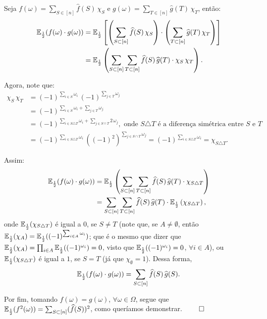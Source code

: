 \par Seja $f(\omega) = \sum_{S \in [n]}\widehat{f}(S)\,\chi_S$ e $g(\omega) = \sum_{T \in [n]}\widehat{g}(T)\,\chi_T$, então:
\begin{align*}
	\operatorname{\mathbb{E}}_{\frac{1}{2}}(f(\omega) \cdot g(\omega)) & = \operatorname{\mathbb{E}}_{\frac{1}{2}}\left[\left(\sum_{S \subset [n]} \widehat{f}(S) \, \chi_S\right) \cdot \left(\sum_{T \subset [n]} \widehat{g}(T) \, \chi_T\right)\right] \\
					  				 & = \operatorname{\mathbb{E}}_{\frac{1}{2}}\left(\sum_{S \subset [n]}\sum_{T \subset[n]} \widehat{f}(S) \, \widehat{g}(T) \cdot \chi_S \, \chi_T\right).
\end{align*}
\par Agora, note que:
\begin{align*}
	\chi_S \, \chi_T & = (-1)^{\sum_{i \in S}\omega_i} \, (-1)^{\sum_{j \in T}\omega_j} \\
					 & = (-1)^{\sum_{i \in S}\omega_i + \sum_{j \in T}\omega_j} \\
					 & = (-1)^{\sum_{i \in S \triangle T}\omega_i + \sum_{j \in S \cap T}2\,\omega_j}, \text{ onde } S \triangle T \text{ é a diferença simétrica entre } S \text{ e } T \\
					 & = (-1)^{\sum_{i \in S \triangle T}\omega_i} \, \left((-1)^2\right)^{\sum_{j \in S \cap T} \omega_j} = (-1)^{\sum_{i \in S \triangle T}\omega_i} = \chi_{S \triangle T}.
\end{align*} 
\par Assim:
\begin{align*}
	\operatorname{\mathbb{E}}_{\frac{1}{2}}(f(\omega) \cdot g(\omega)) & = \operatorname{\mathbb{E}}_{\frac{1}{2}}\left(\sum_{S \subset [n]} \sum_{T \subset [n]} \widehat{f}(S) \, \widehat{g}(T) \cdot \chi_{S \triangle T}\right) \\
									 & = \sum_{S \subset [n]} \sum_{T \subset [n]} \widehat{f}(S) \, \widehat{g}(T) \cdot \operatorname{\mathbb{E}}_{\frac{1}{2}}\left(\chi_{S \triangle T}\right),
\end{align*}
onde $\operatorname{\mathbb{E}}_{\frac{1}{2}}(\chi_{S \triangle T})$ é igual a $0$, se $S \neq T$ (note que, se $A \neq \emptyset$, então $\operatorname{\mathbb{E}}_{\frac{1}{2}}(\chi_A) = \operatorname{\mathbb{E}}_{\frac{1}{2}}((-1)^{\sum_{i \in A} \omega_i})$; que é o mesmo que dizer que $\operatorname{\mathbb{E}}_{\frac{1}{2}}(\chi_A) = \prod_{i \in A}\operatorname{\mathbb{E}}_{\frac{1}{2}}((-1)^{\omega_i}) = 0$, visto que $\operatorname{\mathbb{E}}_{\frac{1}{2}}((-1)^{\omega_i}) = 0$, $\forall i \in A$), ou $\operatorname{\mathbb{E}}_{\frac{1}{2}}(\chi_{S \triangle T})$ é igual a $1$, se $S = T$ (já que $\chi_{\emptyset} = 1$). Dessa forma,
\begin{align*}
	\operatorname{\mathbb{E}}_{\frac{1}{2}}(f(\omega) \cdot g(\omega)) = \sum_{S \subset [n]} \widehat{f}(S) \, \widehat{g}(S).
\end{align*}
\par Por fim, tomando $f(\omega) = g(\omega)$, $\forall \omega \in \Omega$, segue que $\operatorname{\mathbb{E}}_{\frac{1}{2}}(f^2(\omega)) = \sum_{S \subset [n]}(\widehat{f}(S))^2$, como queríamos demonstrar. \hspace{\fill}$\qed$
\vspace{12pt}

